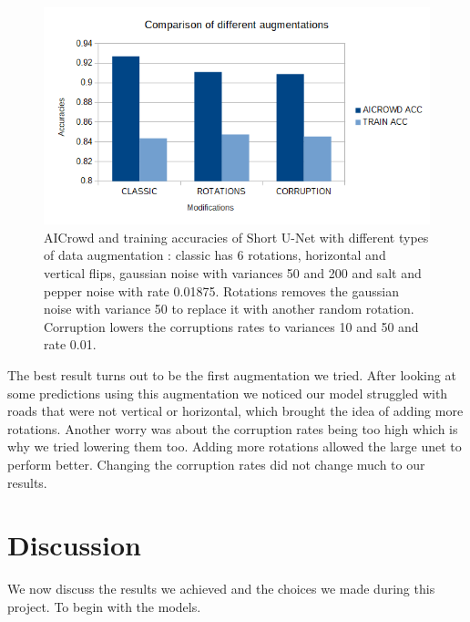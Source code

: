 \documentclass[10pt,conference,compsocconf]{IEEEtran}
\begin{document}
\begin{figure}[H]
    \centering
    \includegraphics[scale = 0.4]{report_images/data_graph.png} %
    \caption{AICrowd and training accuracies of Short U-Net with different types of data augmentation : classic has 6 rotations, horizontal and vertical flips, gaussian noise with variances 50 and 200 and salt and pepper noise with rate 0.01875. Rotations removes the gaussian noise with variance 50 to replace it with another random rotation. Corruption lowers the corruptions rates to variances 10 and 50 and rate 0.01.}
\end{figure}
The best result turns out to be the first augmentation we tried. After looking at some predictions using this augmentation we noticed our model struggled with roads that were not vertical or horizontal, which brought the idea of adding more rotations. Another worry was about the corruption rates being too high which is why we tried lowering them too. Adding more rotations allowed the large unet to perform better. Changing the corruption rates did not change much to our results.
\section{Discussion}
We now discuss the results we achieved and the choices we made during this project. To begin with the models. 
\end{document}
